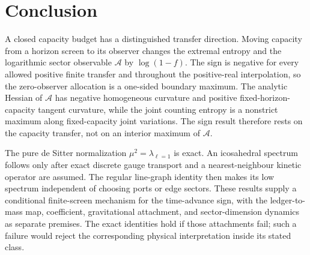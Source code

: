 \documentclass[11pt]{article}
\theoremstyle{remark}
\begin{document}
\section{Conclusion}

A closed capacity budget has a distinguished transfer direction. Moving
capacity from a horizon screen to its observer changes the extremal entropy
and the logarithmic sector observable \(\mathcal A\) by
\(\log(1-f)\). The sign is negative for every allowed positive finite
transfer and throughout the positive-real interpolation, so the zero-observer
allocation is a one-sided boundary maximum. The analytic Hessian of
\(\mathcal A\) has negative homogeneous curvature and positive
fixed-horizon-capacity tangent curvature, while the joint counting entropy is
a nonstrict maximum along fixed-capacity joint variations. The sign result
therefore rests on the capacity transfer, not on an interior maximum of
\(\mathcal A\).

The pure de Sitter normalization \(\mu^2=\lambda_{\ell=1}\) is exact. An
icosahedral spectrum follows only after exact discrete gauge transport and a
nearest-neighbour kinetic operator are assumed. The regular line-graph
identity then makes its low spectrum independent of choosing ports or edge
sectors. These results supply a conditional finite-screen mechanism for the
time-advance sign, with the ledger-to-mass map, coefficient, gravitational
attachment, and sector-dimension dynamics as separate premises.
The exact identities hold if those attachments fail; such a failure
would reject the corresponding physical interpretation inside its stated
class.
\end{document}

